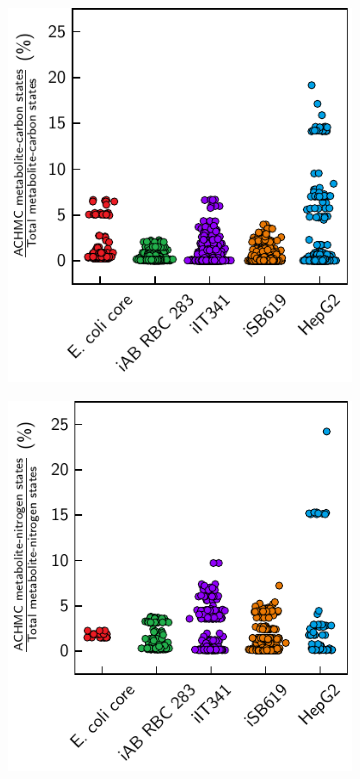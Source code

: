 \documentclass[varwidth]{standalone}
\begin{document}
\vspace*{-2ex}
\begin{figure}
    \begin{subfigure}[t]{0.495\textwidth}
        \caption{}
        \centering
        \includegraphics[width=\textwidth]{subpanels/figure-jitter-fraction-mc-states-carbon.pdf}
    \end{subfigure}
    \begin{subfigure}[t]{0.495\textwidth}
        \caption{}
        \includegraphics[width=\textwidth]{subpanels/figure-jitter-fraction-mc-states-nitrogen.pdf}
    \end{subfigure}
\end{figure}
\end{document}
